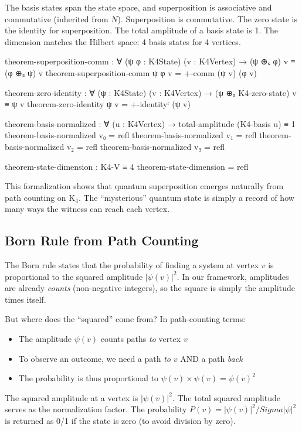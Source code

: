 \documentclass[11pt,a4paper]{book}
\def\Sigma{Sigma}%
\def\mathbb#1{#1}%
\begin{document}
The basis states span the state space, and superposition is associative
and commutative (inherited from $\mathbb{N}$). Superposition is commutative. The zero state is the identity for superposition. The total amplitude of a basis state is 1. The dimension matches the Hilbert space: 4 basis states for 4 vertices.

\begin{code}
theorem-superposition-comm : ∀ (ψ φ : K4State) (v : K4Vertex) →
  (ψ ⊕ₛ φ) v ≡ (φ ⊕ₛ ψ) v
theorem-superposition-comm ψ φ v = +-comm (ψ v) (φ v)

theorem-zero-identity : ∀ (ψ : K4State) (v : K4Vertex) →
  (ψ ⊕ₛ K4-zero-state) v ≡ ψ v
theorem-zero-identity ψ v = +-identityʳ (ψ v)

theorem-basis-normalized : ∀ (u : K4Vertex) → 
  total-amplitude (K4-basis u) ≡ 1
theorem-basis-normalized v₀ = refl
theorem-basis-normalized v₁ = refl
theorem-basis-normalized v₂ = refl
theorem-basis-normalized v₃ = refl

theorem-state-dimension : K4-V ≡ 4
theorem-state-dimension = refl
\end{code}

This formalization shows that quantum superposition emerges naturally from 
path counting on K$_4$. The ``mysterious'' quantum state is simply a record 
of how many ways the witness can reach each vertex.

\subsection{Born Rule from Path Counting}

The Born rule states that the probability of finding a system at vertex $v$ 
is proportional to the squared amplitude $|\psi(v)|^2$. In our framework,
amplitudes are already \emph{counts} (non-negative integers), so the square
is simply the amplitude times itself.

But where does the ``squared'' come from? In path-counting terms:
\begin{itemize}
\item The amplitude $\psi(v)$ counts paths \emph{to} vertex $v$
\item To observe an outcome, we need a path \emph{to} $v$ AND a path \emph{back}
\item The probability is thus proportional to $\psi(v) \times \psi(v) = \psi(v)^2$
\end{itemize}

The squared amplitude at a vertex is $|\psi(v)|^2$. The total squared amplitude serves as the normalization factor. The probability $P(v) = |\psi(v)|^2 / \Sigma|\psi|^2$ is returned as 0/1 if the state is zero (to avoid division by zero).
\end{document}
